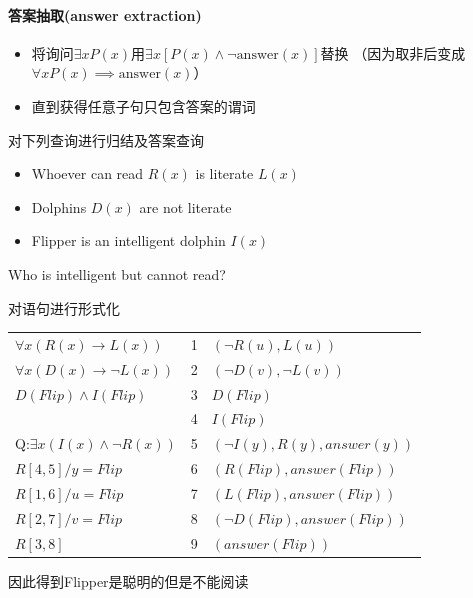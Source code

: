 \paragraph{答案抽取(answer extraction)}
\begin{itemize}
\item 将询问$\exists xP(x)$用$\exists x[P(x)\land\lnot\text{answer}(x)]$替换
（因为取非后变成$\forall x P(x)\implies \text{answer}(x)$）
\item 直到获得任意子句只包含答案的谓词
\end{itemize}
\begin{example}
对下列查询进行归结及答案查询
\begin{itemize}
	\item Whoever can read $R(x)$ is literate $L(x)$
	\item Dolphins $D(x)$ are not literate
	\item Flipper is an intelligent dolphin $I(x)$
\end{itemize}
Who is intelligent but cannot read?
\end{example}
\begin{analysis}
对语句进行形式化
\begin{center}
\begin{tabular}{lll}
$\forall x (R(x)\to L(x))$ & 1 & $(\lnot R(u),L(u))$\\
$\forall x (D(x)\to \lnot L(x))$ & 2 & $(\lnot D(v),\lnot L(v))$\\
$D(Flip)\land I(Flip)$ & 3 & $D(Flip)$\\
 & 4 & $I(Flip)$\\
Q:$\exists x (I(x)\land\lnot R(x))$ & 5 & $(\lnot I(y),R(y),answer(y))$\\\hline 
$R[4,5]/y=Flip$ & 6 & $(R(Flip),answer(Flip))$\\
$R[1,6]/u=Flip$ & 7 & $(L(Flip),answer(Flip))$\\
$R[2,7]/v=Flip$ & 8 & $(\lnot D(Flip),answer(Flip))$\\
$R[3,8]$ & 9 & $(answer(Flip))$
\end{tabular}
\end{center}
因此得到Flipper是聪明的但是不能阅读
\end{analysis}